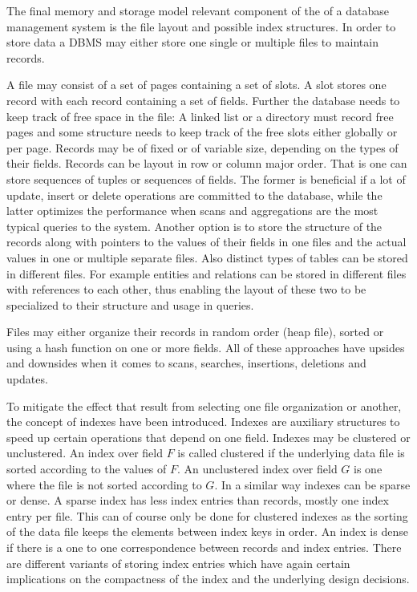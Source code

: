         The final memory and storage model relevant component of the  of a database management system is the file layout and possible index structures. 
        In order to store data a DBMS may either store one single or multiple files to maintain records. 

        A file may consist of a set of pages containing a set of slots. A slot stores one record with each record containing a set of fields. Further the database needs to keep track of free space in the file: A linked list or a directory must record free pages and some structure needs to keep track of the free slots either globally or per page. 
        Records may be of fixed or of variable size, depending on the types of their fields. 
        Records can be layout in row or column major order.
        That is one can store sequences of tuples or sequences of fields.
        The former is beneficial if a lot of update, insert or delete operations are committed to the database, while the latter optimizes the performance when scans and aggregations are the most typical queries to the system.
        Another option is to store the structure of the records along with pointers to the values of their fields in one files and the actual values in one or multiple separate files. 
        Also distinct types of tables can be stored in different files. 
        For example entities and relations can be stored in different files with references to each other, thus enabling the layout of these two to be specialized to their structure and usage in queries.

        Files may either organize their records in random order (heap file), sorted or using a hash function on one or more fields. 
        All of these approaches have upsides and downsides when it comes to scans, searches, insertions, deletions and updates. 

        To mitigate the effect that result from selecting one file organization or another, the concept of indexes have been introduced. 
        Indexes are auxiliary structures to speed up certain operations that depend on one field. 
        Indexes may be clustered or unclustered. 
        An index over field $F$ is called clustered if the underlying data file is sorted according to the values of $F$. 
        An unclustered index over field $G$ is one where the file is not sorted according to $G$. 
        In a similar way indexes can be sparse or dense. 
        A sparse index has less index entries than records, mostly one index entry per file. 
        This can of course only be done for clustered indexes as the sorting of the data file keeps the elements between index keys in order. 
        An index is dense if there is a one to one correspondence between records and index entries. 
        There are different variants of storing index entries which have again certain implications on the compactness of the index and the underlying design decisions.

